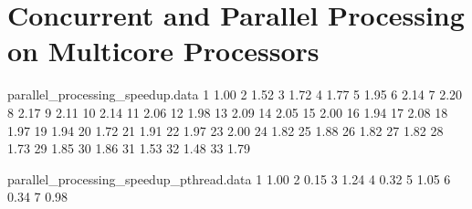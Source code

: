 \section{Concurrent and Parallel Processing on Multicore Processors}

\begin{filecontents}{parallel_processing_speedup.data}
1  1.00
2  1.52
3  1.72
4  1.77
5  1.95
6  2.14
7  2.20
8  2.17
9  2.11
10 2.14
11 2.06
12 1.98
13 2.09
14 2.05
15 2.00
16 1.94
17 2.08
18 1.97
19 1.94
20 1.72
21 1.91
22 1.97
23 2.00
24 1.82
25 1.88
26 1.82
27 1.82
28 1.73
29 1.85
30 1.86
31 1.53
32 1.48
33 1.79
\end{filecontents}

\begin{filecontents}{parallel_processing_speedup_pthread.data}
1  1.00
2  0.15
3  1.24
4  0.32
5  1.05
6  0.34
7  0.98
\end{filecontents}

